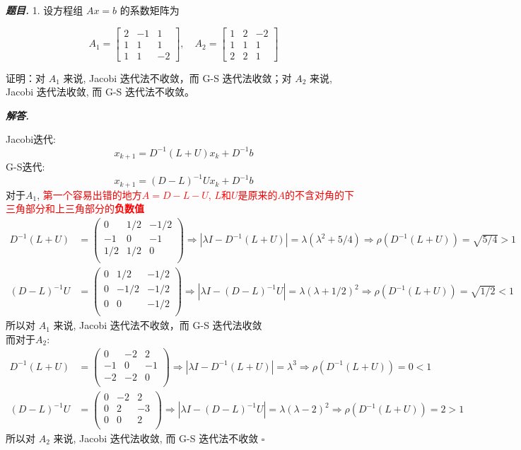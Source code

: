 \documentclass[10pt, a4paper, oneside]{ctexart}
\newenvironment{problem}{\begin{framed}\par\noindent\textbf{\textit{题目. }}}{\end{framed}\par}
\newenvironment{solution}{%
  \par\noindent\textbf{\textit{解答. }}\ignorespaces
}{%
  \hfill\ensuremath{\square}\par %
}
\begin{document}
\begin{problem}
    1. 设方程组 $A x=b$ 的系数矩阵为

    $$
    A_1=\left[\begin{array}{rrr}
    2 & -1 & 1 \\
    1 & 1 & 1 \\
    1 & 1 & -2
    \end{array}\right], \quad A_2=\left[\begin{array}{rrr}
    1 & 2 & -2 \\
    1 & 1 & 1 \\
    2 & 2 & 1
    \end{array}\right]
    $$
    
    
    证明：对 $A_1$ 来说, Jacobi 迭代法不收敛，而 G-S 迭代法收敛；对 $A_2$ 来说, Jacobi 迭代法收敛, 而 G-S 迭代法不收敛。
\end{problem}
\begin{solution}
Jacobi迭代:
$$x_{k+1}=D^{-1}(L+U)x_k+D^{-1}b$$
G-S迭代:
$$x_{k+1}=(D-L)^{-1}Ux_k+D^{-1}b$$
对于$A_1$, \textcolor{red}{第一个容易出错的地方$A=D-L-U$, $L$和$U$是原来的$A$的不含对角的下三角部分和上三角部分的\textbf{负数值}}
\begin{align*}
    D^{-1}(L+U)&=\begin{pmatrix}
        0&1/2&-1/2\\
        -1&0&-1\\
        1/2&1/2&0\\
    \end{pmatrix}\Rightarrow |\lambda I-D^{-1}(L+U)|=\lambda(\lambda^2+5/4)\Rightarrow \rho(D^{-1}(L+U))=\sqrt{5/4}>1\\
   (D-L)^{-1}U&=\begin{pmatrix}
        0&1/2&-1/2\\
        0&-1/2&-1/2\\
        0&0&-1/2\\
    \end{pmatrix}\Rightarrow |\lambda I-(D-L)^{-1}U|=\lambda(\lambda+1/2)^2\Rightarrow \rho(D^{-1}(L+U))=\sqrt{1/2}<1
\end{align*}
所以对 $A_1$ 来说, Jacobi 迭代法不收敛，而 G-S 迭代法收敛\\
而对于$A_2$:
\begin{align*}
    D^{-1}(L+U)&=\begin{pmatrix}
        0&-2&2\\
        -1&0&-1\\
        -2&-2&0\\
    \end{pmatrix}\Rightarrow |\lambda I-D^{-1}(L+U)|=\lambda^3 \Rightarrow \rho(D^{-1}(L+U))=0<1\\
   (D-L)^{-1}U&=\begin{pmatrix}
        0&-2&2\\
        0&2&-3\\
        0&0&2\\
    \end{pmatrix}\Rightarrow |\lambda I-(D-L)^{-1}U|=\lambda(\lambda-2)^2\Rightarrow \rho(D^{-1}(L+U))=2>1
\end{align*}
所以对 $A_2$ 来说, Jacobi 迭代法收敛, 而 G-S 迭代法不收敛
\end{solution}
\end{document}
